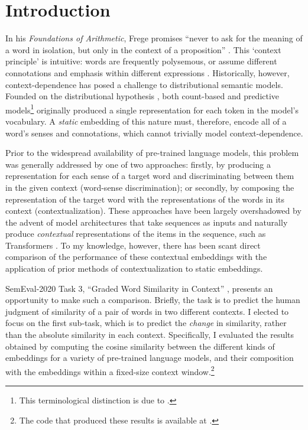 \section{Introduction}
\label{sec:introduction}

In his \emph{Foundations of Arithmetic}, Frege promises ``never to ask for the meaning
of a word in isolation, but only in the context of a proposition''
\parencites*[xvii]{Frege1960}.
This `context principle' is intuitive: words are frequently polysemous, or assume
different connotations and emphasis within different expressions
\parencites[2-3]{Armendariz2020}.
Historically, however, context-dependence has posed a challenge to distributional
semantic models.
Founded on the distributional hypothesis \parencites[e.g.][142-143]{Turney2010}, both
count-based and predictive models\footnote{This terminological distinction is due to
  \textcites{Baroni2014a}.
} originally
produced a single representation for each token in the model's vocabulary.
A \emph{static} embedding of this nature must, therefore, encode all of a word's senses
and connotations, which cannot trivially model context-dependence.

Prior to the widespread availability of pre-trained language models, this problem was
generally addressed by one of two approaches: firstly, by producing a representation
for each sense of a target word and discriminating between them in the given context
(word-sense discrimination); or secondly, by composing the representation of the target
word with the representations of the words in its context (contextualization).
These approaches have been largely overshadowed by the advent of model architectures
that take sequences as inputs and naturally produce \emph{contextual} representations
of the items in the sequence, such as Transformers \parencites{Vaswani2017}.
To my knowledge, however, there has been scant direct comparison of the performance of
these contextual embeddings with the application of prior methods of contextualization
to static embeddings.

SemEval-2020 Task 3, ``Graded Word Similarity in Context''
\parencites{Armendariz2020a}, presents an opportunity to make such a comparison.
Briefly, the task is to predict the human judgment of similarity of a pair of words in
two different contexts.
I elected to focus on the first sub-task, which is to predict the \emph{change} in
similarity, rather than the absolute similarity in each context.
Specifically, I evaluated the results obtained by computing the cosine similarity
between the different kinds of embeddings for a variety of pre-trained language models,
and their composition with the embeddings within a fixed-size context
window.\footnote{The code that produced these results is available at
  .
}
